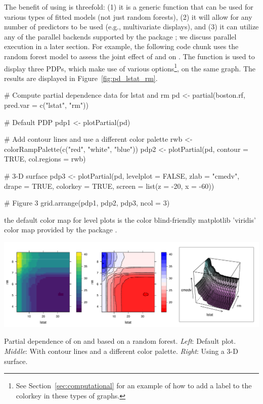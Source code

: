 The benefit of using  is threefold: (1) it is a generic function that can be used for various types of fitted models (not just random forests), (2) it will allow for any number of predictors to be used (e.g., multivariate displays), and (3) it can utilize any of the parallel backends supported by the  package \citep{foreach-pkg}; we discuss parallel execution in a later section. For example, the following code chunk uses the random forest model to assess the joint effect of  and  on . The  function is used to display three PDPs, which make use of various  options\footnote{See Section~\ref{sec:computational} for an example of how to add a label to the colorkey in these types of graphs.}, on the same graph. The results are displayed in Figure~\ref{fig:pd_lstat_rm}.
\begin{example}
# Compute partial dependence data for lstat and rm
pd <- partial(boston.rf, pred.var = c("lstat", "rm"))

# Default PDP
pdp1 <- plotPartial(pd)

# Add contour lines and use a different color palette
rwb <- colorRampPalette(c("red", "white", "blue"))
pdp2 <- plotPartial(pd, contour = TRUE, col.regions = rwb)

# 3-D surface
pdp3 <- plotPartial(pd, levelplot = FALSE, zlab = "cmedv", drape = TRUE,
                    colorkey = TRUE, screen = list(z = -20, x = -60))

# Figure 3
grid.arrange(pdp1, pdp2, pdp3, ncol = 3)
\end{example}
 the default color map for level plots is the color blind-friendly matplotlib \citep{hunter-matplotlib-2007} 'viridis' color map provided by the  package \citep{viridis-pkg}.

\begin{widefigure}[htbp]
  \centering
  \includegraphics[width=1.0\linewidth]{pd_lstat_rm}
  \caption{Partial dependence of  on  and  based on a random forest. \textit{Left}: Default plot. \textit{Middle}: With contour lines and a different color palette. \textit{Right}: Using a 3-D surface.}
  \label{fig:pd_lstat_rm}
\end{widefigure}


